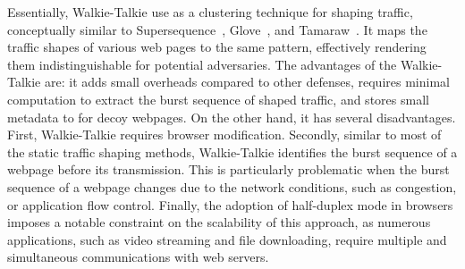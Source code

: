 Essentially, {Walkie-Talkie} use as a clustering technique for shaping traffic, conceptually similar to Supersequence~\cite{wang2014supersequence}, Glove~\cite{nithyanand2014glove}, and Tamaraw~\cite{cai2014systematic}.
It maps the traffic shapes of various web pages to the same pattern, effectively rendering them indistinguishable for potential adversaries.
The advantages of the {Walkie-Talkie} are: it adds small overheads compared to other defenses, requires minimal computation to extract the burst sequence of shaped traffic, and stores small metadata to for decoy webpages.
On the other hand, it has several disadvantages. 
First, {Walkie-Talkie} requires browser modification.  
Secondly, similar to most of the static traffic shaping methods, {Walkie-Talkie} identifies the burst sequence of a webpage before its transmission. 
This is particularly problematic when the burst sequence of a webpage changes due to the network conditions, such as congestion, or application flow control.  
Finally, the adoption of half-duplex mode in browsers imposes a notable constraint on the scalability of this approach, as numerous applications, such as video streaming and file downloading, require multiple and simultaneous communications with web servers.


